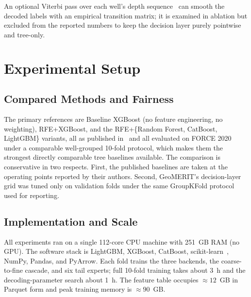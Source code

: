 \documentclass[bdcc,article,submit,pdftex,moreauthors]{Definitions/mdpi}
\begin{document}
An optional Viterbi pass over each well's depth sequence~\cite{viterbi1967,lafferty2001crf,sarawagi2004semimarkov}
can smooth the decoded labels with an empirical transition matrix; it is examined in
ablation but excluded from the reported numbers to keep the decision layer purely pointwise
and tree-only.

\section{Experimental Setup}
\label{sec:setup}

\subsection{Compared Methods and Fairness}
\label{sec:compared}
The primary references are Baseline XGBoost (no feature engineering, no weighting),
RFE+XGBoost, and the RFE+\{Random Forest, CatBoost, LightGBM\} variants, all as published
in~\cite{chen2026rfe} and all evaluated on FORCE 2020 under a comparable well-grouped 10-fold
protocol, which makes them the strongest directly comparable tree baselines available. The
comparison is conservative in two respects. First, the published baselines are taken at the
operating points reported by their authors. Second, GeoMERIT’s decision-layer grid was tuned
only on validation folds under the same GroupKFold protocol used for reporting.

\subsection{Implementation and Scale}
\label{sec:impl}
All experiments ran on a single 112-core CPU machine with 251~GB RAM (no GPU). The software
stack is LightGBM, XGBoost, CatBoost, scikit-learn~\cite{pedregosa2011sklearn}, NumPy,
Pandas, and PyArrow. Each fold trains the three backends, the coarse-to-fine cascade, and
six tail experts; full 10-fold training takes about 3~h and the decoding-parameter search
about 1~h. The feature table occupies $\approx\!12$~GB in Parquet form and peak training
memory is $\approx\!90$~GB.
\end{document}
